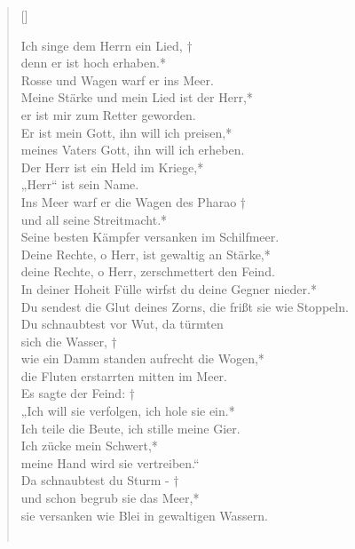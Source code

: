 \begin{verse}[\versewidth]


Ich singe dem Herrn ein Lied, †\\
denn er ist hoch erhaben.*\\
Rosse und Wagen warf er ins Meer.\\
\vin Meine Stärke und mein Lied ist der Herr,*\\
\vin er ist mir zum Retter geworden.\\
Er ist mein Gott, ihn will ich preisen,*\\
meines Vaters Gott, ihn will ich erheben.\\
\vin Der Herr ist ein Held im Kriege,*\\
\vin „Herr“ ist sein Name.\\
Ins Meer warf er die Wagen des Pharao †\\
und all seine Streitmacht.*\\
Seine besten Kämpfer versanken im Schilfmeer.\\
\vin Deine Rechte, o Herr, ist gewaltig an Stärke,*\\
\vin deine Rechte, o Herr, zerschmettert den Feind.\\
In deiner Hoheit Fülle wirfst du deine Gegner nieder.*\\
Du sendest die Glut deines Zorns, die frißt sie wie Stoppeln.\\
\vin Du schnaubtest vor Wut, da türmten\\ 
\vin sich die Wasser, †\\
\vin wie ein Damm standen aufrecht die Wogen,* \\
\vin die Fluten erstarrten mitten im Meer.\\
Es sagte der Feind: †\\
„Ich will sie verfolgen, ich hole sie ein.*\\
Ich teile die Beute, ich stille meine Gier.\\
\vin Ich zücke mein Schwert,*\\
\vin meine Hand wird sie vertreiben.“\\
Da schnaubtest du Sturm - †\\
und schon begrub sie das Meer,*\\
sie versanken wie Blei in gewaltigen Wassern.\\

\\


\end{verse}
